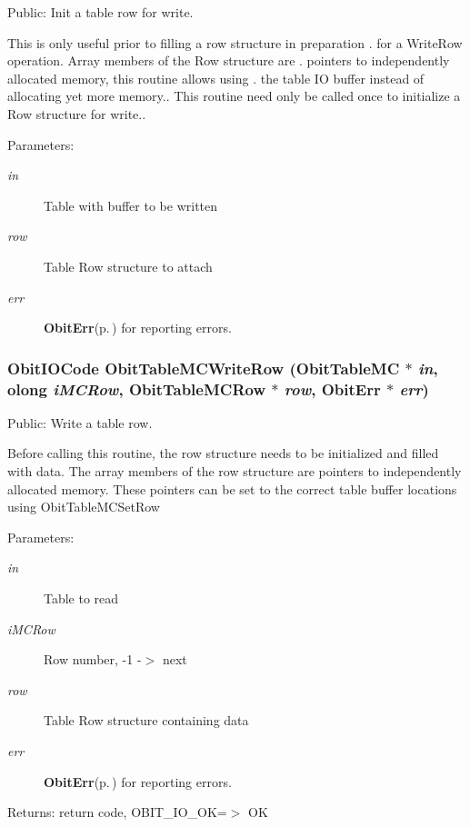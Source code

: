 Public: Init a table row for write. 

This is only useful prior to filling a row structure in preparation . for a Write\-Row operation. Array members of the Row structure are . pointers to independently allocated memory, this routine allows using . the table IO buffer instead of allocating yet more memory.. This routine need only be called once to initialize a Row structure for write.. \begin{Desc}
\item[Parameters:]
\begin{description}
\item[{\em in}]Table with buffer to be written \item[{\em row}]Table Row structure to attach \item[{\em err}]{\bf Obit\-Err}{\rm (p.\,\pageref{structObitErr})} for reporting errors. \end{description}
\end{Desc}
\subsubsection{\setlength{\rightskip}{0pt plus 5cm}Obit\-IOCode Obit\-Table\-MCWrite\-Row ({\bf Obit\-Table\-MC} $\ast$ {\em in}, {\bf olong} {\em i\-MCRow}, {\bf Obit\-Table\-MCRow} $\ast$ {\em row}, {\bf Obit\-Err} $\ast$ {\em err})}\label{ObitTableMC_8h_a20}


Public: Write a table row. 

Before calling this routine, the row structure needs to be initialized and filled with data. The array members of the row structure are pointers to independently allocated memory. These pointers can be set to the correct table buffer locations using Obit\-Table\-MCSet\-Row \begin{Desc}
\item[Parameters:]
\begin{description}
\item[{\em in}]Table to read \item[{\em i\-MCRow}]Row number, -1 -$>$ next \item[{\em row}]Table Row structure containing data \item[{\em err}]{\bf Obit\-Err}{\rm (p.\,\pageref{structObitErr})} for reporting errors. \end{description}
\end{Desc}
\begin{Desc}
\item[Returns:]return code, OBIT\_\-IO\_\-OK=$>$ OK \end{Desc}
